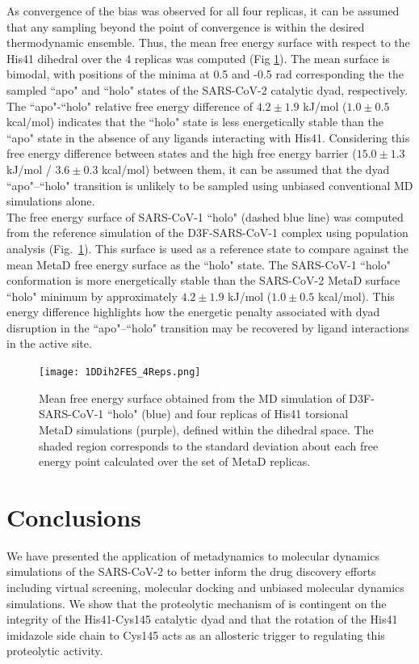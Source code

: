As convergence of the bias was observed for all four replicas, it can be assumed that any sampling beyond the point of convergence is within the desired thermodynamic ensemble. Thus, the mean free energy surface with respect to the His41 \dihtwo dihedral over the 4 replicas was computed (Fig \ref{fig:1DPMFAll_Dihtwo}). The mean surface is bimodal, with positions of the minima at 0.5 and -0.5 rad corresponding the the sampled ``apo" and ``holo" states of the SARS-CoV-2 \mpro catalytic dyad, respectively. The ``apo"-``holo" relative free energy difference of $4.2 \pm 1.9$ kJ/mol ($1.0 \pm 0.5$ kcal/mol) indicates that the ``holo" state is less energetically stable than the ``apo" state in the absence of any ligands interacting with His41. Considering this free energy difference between states and the high free energy barrier ($15.0 \pm 1.3$ kJ/mol / $3.6 \pm 0.3$ kcal/mol) between them, it can be assumed that the dyad ``apo"--``holo" transition is unlikely to be sampled using unbiased conventional MD simulations alone.\\

The free energy surface of SARS-CoV-1 ``holo" (dashed blue line) was computed from the reference simulation of the D3F-SARS-CoV-1 \mpro complex using population analysis (Fig.~\ref{fig:1DPMFAll_Dihtwo}). This surface is used as a reference state to compare against the mean MetaD free energy surface as the ``holo" state. The SARS-CoV-1 ``holo" conformation is more energetically stable than the SARS-CoV-2 MetaD surface ``holo" minimum by approximately $4.2 \pm 1.9$ kJ/mol ($1.0 \pm 0.5$ kcal/mol). This energy difference highlights how the energetic penalty associated with dyad disruption in the ``apo"--``holo" transition may be recovered by ligand interactions in the active site.\\

\begin{figure}[!h]
    \centering
    \texttt{[image: 1DDih2FES\_4Reps.png]}
    \caption{Mean free energy surface obtained from the MD simulation of D3F-SARS-CoV-1 ``holo" (blue) and four replicas of His41 torsional MetaD simulations (purple), defined within the \dihtwo dihedral space. The shaded region corresponds to the standard deviation about each free energy point calculated over the set of MetaD replicas.}
    \label{fig:1DPMFAll_Dihtwo}
\end{figure}
%
%
%
%
%
%
%
\newpage
\section*{Conclusions}
We have presented the application of metadynamics to molecular dynamics simulations of the SARS-CoV-2 \mpro to better inform the drug discovery efforts including virtual screening, molecular docking and unbiased molecular dynamics simulations. We show that the proteolytic mechanism of \mpro is contingent on the integrity of the His41-Cys145 catalytic dyad and that the rotation of the His41 imidazole side chain to Cys145 acts as an allosteric trigger to regulating this proteolytic activity.\\

